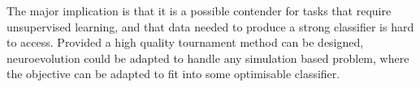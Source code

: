 \documentclass[12pt,a4paper]{article}
\begin{document}
    The major implication is that it is a possible contender for tasks that require unsupervised learning, and that data needed to produce a strong classifier is hard to access. Provided a high quality tournament method can be designed, neuroevolution could be adapted to handle any simulation based problem, where the objective can be adapted to fit into some optimisable classifier.

\footnotesize{}
% 
\end{document}
